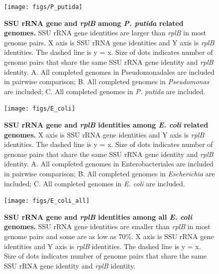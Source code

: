 \documentclass[]{msu-thesis}
\begin{document}
\begin{figure}[tbph!]
  \centering
  \texttt{[image: figs/P\_putida]}
  \caption[SSU rRNA gene and \textit{rplB} among \textit{P. putida} related genomes]{\textbf{SSU rRNA gene and \textit{rplB} among \textit{P. putida} related genomes.} SSU rRNA gene identities are larger than \textit{rplB} in most genome pairs. X axis is SSU rRNA gene identities and Y axis is \textit{rplB} identities. The dashed line is y = x. Size of dots indicates number of genome pairs that share the same SSU rRNA gene identity and \textit{rplB} identity. A. All completed genomes in Pseudomonadales are included in pairwise comparison; B. All completed genomes in \textit{Pseudomonas} are included; C. All completed genomes in \textit{P. putida} are included.}
  \label{fig:PPutida}
\end{figure}


\begin{figure}[tbph!]
  \centering
  \texttt{[image: figs/E\_coli]}
  \caption[SSU rRNA gene and \textit{rplB} identities among \textit{E. coli} related genomes]{\textbf{SSU rRNA gene and \textit{rplB} identities among \textit{E. coli} related genomes.} X axis is SSU rRNA gene identities and Y axis is \textit{rplB} identities. The dashed line is y = x. Size of dots indicates number of genome pairs that share the same SSU rRNA gene identity and \textit{rplB} identity. A. All completed genomes in Enterobacteriales are included in pairwise comparison; B. All completed genomes in \textit{Escherichia} are included; C. All completed genomes in \textit{E. coli} are included.}
  \label{fig:EColi}
\end{figure}


\begin{figure}[tbph!]
  \centering
  \texttt{[image: figs/E\_coli\_all]}
  \caption[SSU rRNA gene and \textit{rplB} identities among all \textit{E. coli} genomes]{\textbf{SSU rRNA gene and \textit{rplB} identities among all \textit{E. coli} genomes.} SSU rRNA gene identities are smaller than \textit{rplB} in most genome pairs and some are as low as 70\%. X axis is SSU rRNA gene identities and Y axis is \textit{rplB} identities. The dashed line is y = x. Size of dots indicates number of genome pairs that share the same SSU rRNA gene identity and \textit{rplB} identity.}
  \label{fig:EColiAll}
\end{figure}

\end{document}
